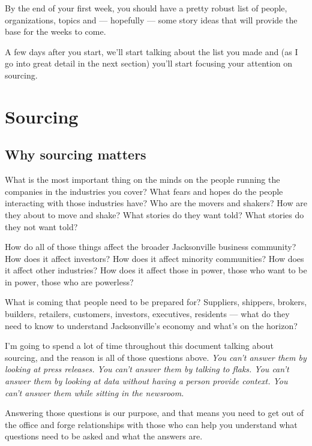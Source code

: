 \documentclass[
  12pt,
  american,
  letterpaperpaper,
  extrafontsizes,onecolumn,openright
  ]{memoir}
\begin{document}
By the end of your first week, you should have a pretty robust list of people, organizations, topics and --- hopefully --- some story ideas that will provide the base for the weeks to come.

A few days after you start, we'll start talking about the list you made and (as I go into great detail in the next section) you'll start focusing your attention on sourcing.

\hypertarget{sourcing}{%
\chapter{Sourcing}\label{sourcing}}

\hypertarget{why-sourcing-matters}{%
\section*{Why sourcing matters}\label{why-sourcing-matters}}

What is the most important thing on the minds on the people running the companies in the industries you cover? What fears and hopes do the people interacting with those industries have? Who are the movers and shakers? How are they about to move and shake? What stories do they want told? What stories do they not want told?

How do all of those things affect the broader Jacksonville business community? How does it affect investors? How does it affect minority communities? How does it affect other industries? How does it affect those in power, those who want to be in power, those who are powerless?

What is coming that people need to be prepared for? Suppliers, shippers, brokers, builders, retailers, customers, investors, executives, residents --- what do they need to know to understand Jacksonville's economy and what's on the horizon?

I'm going to spend a lot of time throughout this document talking about sourcing, and the reason is all of those questions above. \emph{You can't answer them by looking at press releases. You can't answer them by talking to flaks. You can't answer them by looking at data without having a person provide context. You can't answer them while sitting in the newsroom.}

Answering those questions is our purpose, and that means you need to get out of the office and forge relationships with those who can help you understand what questions need to be asked and what the answers are.
\end{document}
